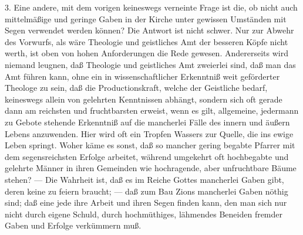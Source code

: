 3. Eine andere, mit dem vorigen keineswegs verneinte Frage ist die, ob nicht auch mittelmäßige und geringe Gaben in der Kirche unter gewissen Umständen mit Segen verwendet werden können? Die Antwort ist nicht schwer. Nur zur Abwehr des Vorwurfs, als wäre Theologie und geistliches Amt der besseren Köpfe nicht werth, ist oben von hohen Anforderungen die Rede gewesen. Andererseits wird niemand leugnen, daß Theologie und geistliches Amt zweierlei sind, daß man das Amt führen kann, ohne ein in wissenschaftlicher Erkenntniß weit geförderter Theologe zu sein, daß die Productionskraft, welche der Geistliche bedarf, keineswegs allein von gelehrten Kenntnissen abhängt, sondern sich oft gerade dann am reichsten und fruchtbarsten erweist, wenn es gilt, allgemeine, jedermann zu Gebote stehende Erkenntniß auf die mancherlei Fälle des innern und äußern Lebens anzuwenden. Hier wird oft ein Tropfen Wassers zur Quelle, die ins ewige Leben springt. Woher käme es sonst, daß so mancher gering begabte Pfarrer mit dem segensreichsten Erfolge arbeitet, während umgekehrt oft hochbegabte und gelehrte Männer in ihren Gemeinden wie hochragende, aber unfruchtbare Bäume stehen? — Die Wahrheit ist, daß es im Reiche Gottes mancherlei Gaben gibt, deren keine zu feiern braucht; — daß zum Bau Zions mancherlei Gaben nöthig sind; daß eine jede ihre Arbeit und ihren Segen finden kann, den man sich nur nicht durch eigene Schuld, durch hochmüthiges, lähmendes Beneiden fremder Gaben und Erfolge verkümmern muß.

